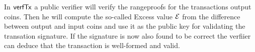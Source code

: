 In $\mathsf{verfTx}$ a public verifier will verify the rangeproofs for the transactions output coins. Then he will compute the so-called Excess value $\mathcal{E}$ from the difference between output and input coins
and use it as the public key for validating the transation signature. If the signature is now also found to be correct the verfiier can deduce that the transaction is well-formed and valid.

\begin{figure}
    \begin{center}
\end{center}
\end{figure}
